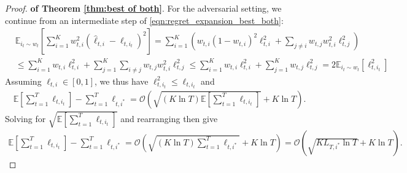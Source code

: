 \begin{proof}{\textbf{of Theorem \ref{thm:best of both}}.}
For the adversarial setting, we continue from an intermediate step of \eqref{eqn:regret_expansion_best_both}: 
\begin{align*}
&\mathbb{E}_{i_t\sim w_t}\left[\sum_{i=1}^Kw_{t,i}^2(\hat{\ell}_{t,i}-\ell_{t,i_t})^2\right]
=\sum_{i=1}^K \left( w_{t,i}(1-w_{t,i})^2\ell_{t,i}^2 +\sum_{j\neq i} w_{t,j}w_{t,i}^2\ell_{t,j}^2 \right) \\
&\leq \sum_{i=1}^K w_{t,i}\ell_{t,i}^2 + \sum_{j=1}^K \sum_{i\neq j} w_{t,j}w_{t,i}^2\ell_{t,j}^2\leq \sum_{i=1}^K w_{t,i}\ell_{t,i}^2 + \sum_{j=1}^K w_{t,j}\ell_{t,j}^2 = 2\mathbb{E}_{i_t\sim w_t}\left[\ell_{t,i_t}^2\right]
\end{align*}
Assuming $\ell_{t,i}\in [0,1]$, we thus have $\ell_{t,i_t}^2\leq \ell_{t,i_t}$ and  
\begin{align*}
\mathbb{E}\left[ \sum_{t=1}^T \ell_{t,i_t} \right] - \sum_{t=1}^T \ell_{t,i^*} = \mathcal{O}\left( \sqrt{(K\ln T)\mathbb{E}\left[ \sum_{t=1}^T \ell_{t,i_t} \right]} + K\ln T\right). 
\end{align*}
Solving for $\sqrt{\mathbb{E}\left[ \sum_{t=1}^T\ell_{t,i_t} \right]}$ and rearranging then give
\begin{align*}
\mathbb{E}\left[ \sum_{t=1}^T \ell_{t,i_t} \right] - \sum_{t=1}^T \ell_{t,i^*} = \mathcal{O}\left( \sqrt{(K\ln T)\sum_{t=1}^T \ell_{t,i^*} } + K\ln T\right)=\mathcal{O}\left(\sqrt{KL_{T,i^*}\ln T}+K\ln T\right). 
\end{align*}
\end{proof}

